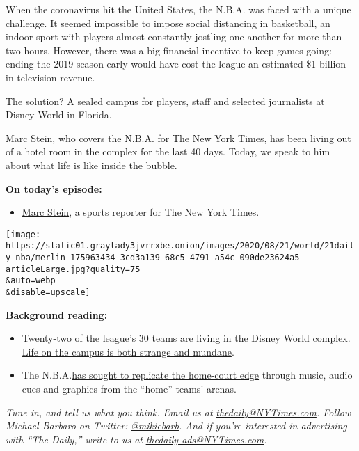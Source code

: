 When the coronavirus hit the United States, the N.B.A. was faced with a
unique challenge. It seemed impossible to impose social distancing in
basketball, an indoor sport with players almost constantly jostling one
another for more than two hours. However, there was a big financial
incentive to keep games going: ending the 2019 season early would have
cost the league an estimated \$1 billion in television revenue.

The solution? A sealed campus for players, staff and selected
journalists at Disney World in Florida.

Marc Stein, who covers the N.B.A. for The New York Times, has been
living out of a hotel room in the complex for the last 40 days. Today,
we speak to him about what life is like inside the bubble.

\textbf{On today's episode:}

\begin{itemize}
\tightlist
\item
  \href{https://www.nytimes3xbfgragh.onion/by/marc-stein}{Marc Stein}, a
  sports reporter for The New York Times.
\end{itemize}

\texttt{[image: https://static01.graylady3jvrrxbe.onion/images/2020/08/21/world/21daily-nba/merlin\_175963434\_3cd3a139-68c5-4791-a54c-090de23624a5-articleLarge.jpg?quality=75\\\&auto=webp\\\&disable=upscale]}

\textbf{Background reading:}

\begin{itemize}
\item
  Twenty-two of the league's 30 teams are living in the Disney World
  complex.
  \href{https://www.nytimes3xbfgragh.onion/2020/07/27/sports/basketball/coronavirus-nba-season-bubble-disney-world.html?searchResultPosition=15}{Life
  on the campus is both strange and mundane}.
\item
  The
  N.B.A.\href{https://www.nytimes3xbfgragh.onion/2020/08/16/sports/basketball/nba-homecourt-advantage-wnba.html?searchResultPosition=7}{has
  sought to replicate the home-court edge} through music, audio cues and
  graphics from the ``home'' teams' arenas.
\end{itemize}

\emph{Tune in, and tell us what you think. Email us at}
\href{mailto:thedaily@NYTimes.com}{\emph{thedaily@NYTimes.com}}\emph{.
Follow Michael Barbaro on Twitter:}
\href{https://twitter.com/mikiebarb}{\emph{@mikiebarb}}\emph{. And if
you're interested in advertising with ``The Daily,'' write to us at}
\href{mailto:thedaily-ads@NYTimes.com}{\emph{thedaily-ads@NYTimes.com}}\emph{.}

